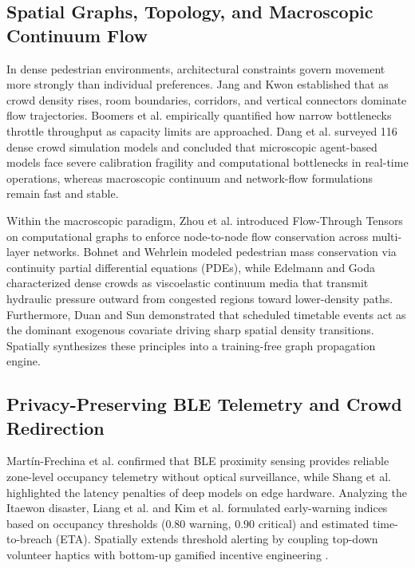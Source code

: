\documentclass[conference,a4paper]{IEEEtran}
\begin{document}
\subsection{Spatial Graphs, Topology, and Macroscopic Continuum Flow}
In dense pedestrian environments, architectural constraints govern movement more strongly than individual preferences. Jang and Kwon \cite{jang2026} established that as crowd density rises, room boundaries, corridors, and vertical connectors dominate flow trajectories. Boomers et al. \cite{boomers2024} empirically quantified how narrow bottlenecks throttle throughput as capacity limits are approached. Dang et al. \cite{dang2024} surveyed 116 dense crowd simulation models and concluded that microscopic agent-based models \cite{helbing2000} face severe calibration fragility and computational bottlenecks in real-time operations, whereas macroscopic continuum \cite{hughes2002} and network-flow formulations remain fast and stable.

Within the macroscopic paradigm, Zhou et al. \cite{zhou2025} introduced Flow-Through Tensors on computational graphs to enforce node-to-node flow conservation across multi-layer networks. Bohnet and Wehrlein \cite{bohnet2025} modeled pedestrian mass conservation via continuity partial differential equations (PDEs), while Edelmann and Goda \cite{edelmann2026} characterized dense crowds as viscoelastic continuum media that transmit hydraulic pressure outward from congested regions toward lower-density paths. Furthermore, Duan and Sun \cite{duan2026} demonstrated that scheduled timetable events act as the dominant exogenous covariate driving sharp spatial density transitions. Spatially synthesizes these principles into a training-free graph propagation engine.

\subsection{Privacy-Preserving BLE Telemetry and Crowd Redirection}
Mart\'in-Frechina et al. \cite{martin2025} confirmed that BLE proximity sensing provides reliable zone-level occupancy telemetry without optical surveillance, while Shang et al. \cite{shang2026} highlighted the latency penalties of deep models on edge hardware. Analyzing the Itaewon disaster, Liang et al. \cite{liang2024} and Kim et al. \cite{kim2026} formulated early-warning indices based on occupancy thresholds ($0.80$ warning, $0.90$ critical) and estimated time-to-breach (ETA). Spatially extends threshold alerting by coupling top-down volunteer haptics with bottom-up gamified incentive engineering \cite{deterding2011}.
\end{document}
